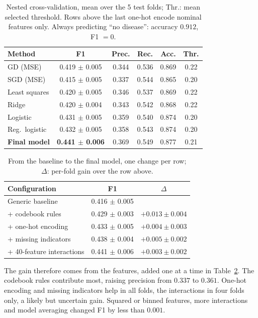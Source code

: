 \documentclass[10pt,conference,compsocconf]{IEEEtran}
\begin{document}
\begin{table}[!h]
\centering\small
\setlength{\tabcolsep}{4pt}
\begin{tabular}{lccccc}
\toprule
Method & F1 & Prec. & Rec. & Acc. & Thr. \\
\midrule
GD (MSE) & 0.419 $\pm$ 0.005 & 0.344 & 0.536 & 0.869 & 0.22 \\
SGD (MSE) & 0.415 $\pm$ 0.005 & 0.337 & 0.544 & 0.865 & 0.20 \\
Least squares & 0.420 $\pm$ 0.005 & 0.346 & 0.537 & 0.869 & 0.22 \\
Ridge & 0.420 $\pm$ 0.004 & 0.343 & 0.542 & 0.868 & 0.22 \\
Logistic & 0.431 $\pm$ 0.005 & 0.359 & 0.540 & 0.874 & 0.20 \\
Reg.\ logistic & 0.432 $\pm$ 0.005 & 0.358 & 0.543 & 0.874 & 0.20 \\
\textbf{Final model} & \textbf{0.441 $\pm$ 0.006} & 0.369 & 0.549 & 0.877 & 0.21 \\
\bottomrule
\end{tabular}
\caption{Nested cross-validation, mean over the 5 test folds; Thr.: mean
selected threshold. Rows above the last one-hot encode nominal features
only. Always predicting ``no disease'': accuracy $0.912$, F1 $=0$.}
\label{tab:methods}
\end{table}

\begin{table}[!h]
\centering\small
\begin{tabular}{lcc}
\toprule
Configuration & F1 & $\Delta$ \\
\midrule
Generic baseline & 0.416 $\pm$ 0.005 & \\
+ codebook rules & 0.429 $\pm$ 0.003 & $+0.013\pm0.004$ \\
+ one-hot encoding & 0.433 $\pm$ 0.005 & $+0.004\pm0.003$ \\
+ missing indicators & 0.438 $\pm$ 0.004 & $+0.005\pm0.002$ \\
+ 40-feature interactions & 0.441 $\pm$ 0.006 & $+0.003\pm0.002$ \\
\bottomrule
\end{tabular}
\caption{From the baseline to the final model, one change per row;
$\Delta$: per-fold gain over the row above.}
\label{tab:ablation}
\end{table}

The gain therefore comes from the features, added one at a time in
Table~\ref{tab:ablation}. The codebook rules contribute most, raising
precision from $0.337$ to $0.361$. One-hot encoding and missing indicators
help in all folds, the interactions in four folds only, a likely but
uncertain gain. Squared or binned features, more interactions and model
averaging changed F1 by less than $0.001$.
\end{document}
